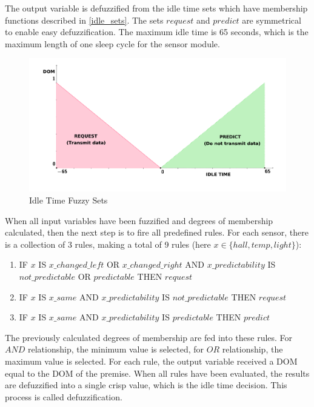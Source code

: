 The output variable is defuzzified from the idle time sets which have membership functions described in \autoref{idle_sets}. The sets $request$ and $predict$ are symmetrical to enable easy defuzzification. The maximum idle time is 65 seconds, which is the maximum length of one sleep cycle for the sensor module. 

\begin{figure}[h!]
\centering
\includegraphics[scale=0.58]{4/figures/result_sets.pdf}
\caption{Idle Time Fuzzy Sets}
\label{idle_sets}
\end{figure}

When all input variables have been fuzzified and degrees of membership calculated, then the next step is to fire all predefined rules. For each sensor, there is a collection of 3 rules, making a total of 9 rules (here $x \in \{hall, temp, light\}$):

\begin{enumerate}
\item IF $x$ IS $x\_changed\_left$ OR $x\_changed\_right$ AND $x\_predictability$ IS $not\_predictable$ OR $predictable$ THEN $request$
\item IF $x$ IS $x\_same$ AND $x\_predictability$ IS $not\_predictable$ THEN $request$
\item IF $x$ IS $x\_same$ AND $x\_predictability$ IS $predictable$ THEN $predict$
\end{enumerate}

The previously calculated degrees of membership are fed into these rules. For $AND$ relationship, the minimum value is selected, for $OR$ relationship, the maximum value is selected. For each rule, the output variable received a DOM equal to the DOM of the premise. When all rules have been evaluated, the results are defuzzified into a single crisp value, which is the idle time decision. This process is called defuzzification.

